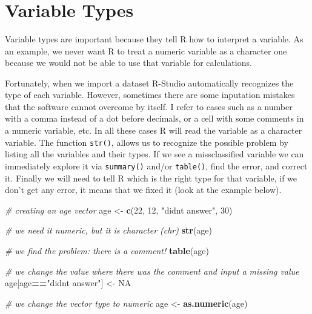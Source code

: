 \documentclass[
]{svmono}
\newenvironment{Shaded}{\begin{snugshade}}{\end{snugshade}}
\newcommand{\CommentTok}[1]{\textcolor[rgb]{0.56,0.35,0.01}{\textit{#1}}}
\newcommand{\ConstantTok}[1]{\textcolor[rgb]{0.56,0.35,0.01}{#1}}
\newcommand{\DecValTok}[1]{\textcolor[rgb]{0.00,0.00,0.81}{#1}}
\newcommand{\FunctionTok}[1]{\textcolor[rgb]{0.13,0.29,0.53}{\textbf{#1}}}
\newcommand{\NormalTok}[1]{#1}
\newcommand{\OtherTok}[1]{\textcolor[rgb]{0.56,0.35,0.01}{#1}}
\newcommand{\SpecialCharTok}[1]{\textcolor[rgb]{0.81,0.36,0.00}{\textbf{#1}}}
\newcommand{\StringTok}[1]{\textcolor[rgb]{0.31,0.60,0.02}{#1}}
\begin{document}
~

~

~

\hypertarget{variable-types}{%
\section{Variable Types}\label{variable-types}}

Variable types are important because they tell R how to interpret a
variable. As an example, we never want R to treat a numeric variable as
a character one because we would not be able to use that variable for
calculations.

Fortunately, when we import a dataset R-Studio automatically recognizes
the type of each variable. However, sometimes there are some inputation
mistakes that the software cannot overcome by itself. I refer to cases
such as a number with a comma instead of a dot before decimals, or a
cell with some comments in a numeric variable, etc. In all these cases R
will read the variable as a character variable. The function \texttt{str()},
allows us to recognize the possible problem by listing all the variables
and their types. If we see a missclassified variable we can immediately
explore it via \texttt{summary()} and/or \texttt{table()}, find the error, and correct
it. Finally we will need to tell R which is the right type for that
variable, if we don't get any error, it means that we fixed it (look at
the example below).

\begin{Shaded}
\begin{Highlighting}[]
\CommentTok{\# creating an age vector}
\NormalTok{age }\OtherTok{\textless{}{-}} \FunctionTok{c}\NormalTok{(}\DecValTok{22}\NormalTok{, }\DecValTok{12}\NormalTok{, }\StringTok{"didn\textquotesingle{}t answer"}\NormalTok{, }\DecValTok{30}\NormalTok{)}

\CommentTok{\# we need it numeric, but it is character (chr)}
\FunctionTok{str}\NormalTok{(age)}

\CommentTok{\# we find the problem: there is a comment!}
\FunctionTok{table}\NormalTok{(age)}

\CommentTok{\# we change the value where there was the comment and input a missing value}
\NormalTok{age[age}\SpecialCharTok{==}\StringTok{"didn\textquotesingle{}t answer"}\NormalTok{] }\OtherTok{\textless{}{-}} \ConstantTok{NA}

\CommentTok{\# we change the vector type to numeric}
\NormalTok{age }\OtherTok{\textless{}{-}} \FunctionTok{as.numeric}\NormalTok{(age)}
\end{Highlighting}
\end{Shaded}
\end{document}
